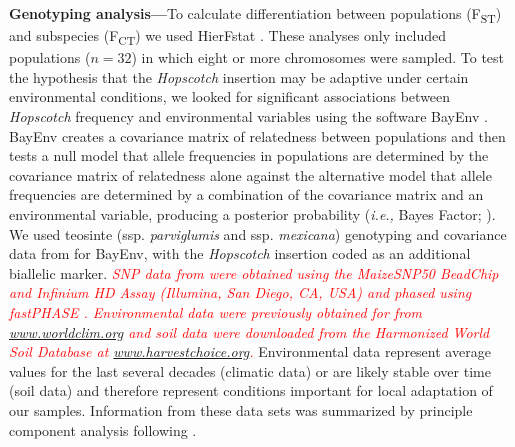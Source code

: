 \documentclass[11pt]{article} %
\newcommand{\track}[1]{\textcolor{red}{\emph{\normalsize #1}} }
\begin{document}
\begin{linenumbers}
\begin{flushleft}
\textbf{Genotyping analysis---}To calculate differentiation between populations (F\textsubscript{ST}) and subspecies (F\textsubscript{CT}) we used HierFstat \citep{Goudet2005}. These analyses only included populations ($n = 32$) in which eight or more chromosomes were sampled. To test the hypothesis that the \emph{Hopscotch} insertion may be adaptive under certain environmental conditions, we looked for significant associations between \emph{Hopscotch} frequency and environmental variables using the software BayEnv \citep{Coop2010}. BayEnv creates a covariance matrix of relatedness between populations and then tests a null model that allele frequencies in populations are determined by the covariance matrix of relatedness alone against the alternative model that allele frequencies are determined by a combination of the covariance matrix and an environmental variable, producing a posterior probability (\emph{i.e.,} Bayes Factor; \citealt{Coop2010}). We used teosinte (ssp. \emph{parviglumis} and ssp. \emph{mexicana}) genotyping and covariance data from \citet{Pyhajarvi2013} for BayEnv, with the \emph{Hopscotch} insertion coded as an additional biallelic marker. \track{SNP data from \citet{Pyhajarvi2013} were obtained using the MaizeSNP50 BeadChip and Infinium HD Assay (Illumina, San Diego, CA, USA) and phased using fastPHASE \citep{Scheet2006}. Environmental data were previously obtained for \citet{Pyhajarvi2013} from \url{www.worldclim.org} and soil data were downloaded from the Harmonized World Soil Database \citep{FAOHWSD} at \url{www.harvestchoice.org}.}  Environmental data represent average values for the last several decades (climatic data) or are likely stable over time (soil data) and therefore represent conditions important for local adaptation of our samples.  Information from these data sets was summarized by principle component analysis following \citet{Pyhajarvi2013}.


\end{flushleft}
\end{linenumbers}
\end{document}
